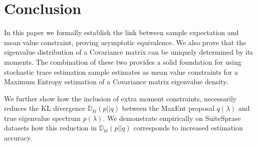 \documentclass[journal]{IEEEtran}
\begin{document}
	
	
	
	
	
	
	\section{Conclusion}
	In this paper we formally establish the link between sample expectation and mean value constraint, proving asymptotic equivalence. We also prove that the eigenvalue distribution of a Covariance matrix can be uniquely determined by its moments. The combination of these two provides a solid foundation for using stochastic trace estimation sample estimates as mean value constraints for a Maximum Entropy estimation of a Covariance matrix eigenvalue density.
	
	We further show how the inclusion of extra moment constraints, necessarily reduces the KL divergence $\mathbb{D}_{kl}(p||q)$ between the MaxEnt proposal $q(\lambda)$ and true eigenvalue spectrum $p(\lambda)$. We demonstrate empirically on SuiteSprase datasets how this reduction in $\mathbb{D}_{kl}(p||q)$ corresponds to increased estimation accuracy. 
	
\end{document}
